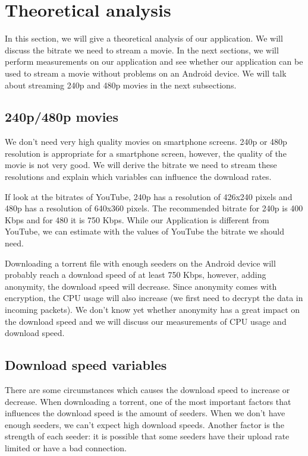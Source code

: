 \section{Theoretical analysis}
	In this section, we will give a theoretical analysis of our application. We will discuss the bitrate we need to stream a movie. In the next sections, we will perform measurements on our application and see whether our application can be used to stream a movie without problems on an Android device. We will talk about streaming 240p and 480p movies in the next subsections.
	
	\subsection{240p/480p movies}
		We don't need very high quality movies on smartphone screens. 240p or 480p resolution is appropriate for a smartphone screen, however, the quality of the movie is not very good. We will derive the bitrate we need to stream these resolutions and explain which variables can influence the download rates.
		
		If look at the bitrates of YouTube, 240p has a resolution of 426x240 pixels and 480p has a resolution of 640x360 pixels. The recommended bitrate for 240p is 400 Kbps and for 480 it is 750 Kbps. While our Application is different from YouTube, we can estimate with the values of YouTube the bitrate we should need.
		
		Downloading a torrent file with enough seeders on the Android device will probably reach a download speed of at least 750 Kbps, however, adding anonymity, the download speed will decrease. Since anonymity comes with encryption, the CPU usage will also increase (we first need to decrypt the data in incoming packets). We don't know yet whether anonymity has a great impact on the download speed and we will discuss our measurements of CPU usage and download speed.
		
	\subsection{Download speed variables}
		There are some circumstances which causes the download speed to increase or decrease. When downloading a torrent, one of the most important factors that influences the download speed is the amount of seeders. When we don't have enough seeders, we can't expect high download speeds. Another factor is the strength of each seeder: it is possible that some seeders have their upload rate limited or have a bad connection.
		
